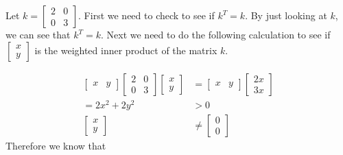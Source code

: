 	\begin{problem}
		Let $k=\left[\begin{smallmatrix}2&0\\0&3\end{smallmatrix}\right]$. First we need to check to see if $k^T=k$. By just looking at $k$, we can see that $k^{T}=k$. Next we need to do the following calculation to see if $\left[\begin{smallmatrix}x\\y\end{smallmatrix}\right]$ is the weighted inner product of the matrix $k$.

		\begin{align}
			\begin{bmatrix} x&y \end{bmatrix} \begin{bmatrix} 2&0\\0&3 \end{bmatrix} \begin{bmatrix} x\\y \end{bmatrix} &= \begin{bmatrix} x&y \end{bmatrix} \begin{bmatrix} 2x\\3x \end{bmatrix} \\
					 =2x^2+2y^2&>0\\
			\begin{bmatrix} x\\y \end{bmatrix} &\neq\begin{bmatrix} 0\\0 \end{bmatrix} 
		\end{align}
		Therefore we know that 
	\end{problem}

